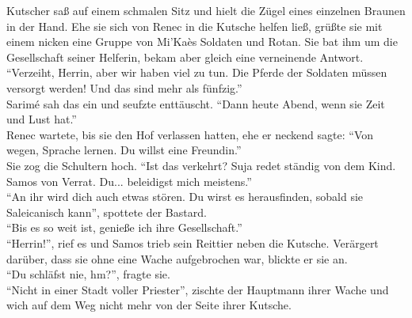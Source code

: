 Kutscher saß auf einem schmalen Sitz und hielt die Zügel eines einzelnen Braunen in der Hand. Ehe 
sie sich von Renec in die Kutsche helfen ließ, grüßte sie mit einem nicken eine Gruppe von Mi'Kaès 
Soldaten und Rotan. Sie bat ihm um die Gesellschaft seiner Helferin, bekam aber gleich eine 
verneinende Antwort. ``Verzeiht, Herrin, aber wir haben viel zu tun. Die Pferde der Soldaten müssen 
versorgt werden! Und das sind mehr als fünfzig.''\\
Sarimé sah das ein und seufzte enttäuscht. ``Dann heute Abend, wenn sie Zeit und Lust hat.''\\
Renec wartete, bis sie den Hof verlassen hatten, ehe er neckend sagte: ``Von wegen, Sprache lernen. 
Du willst eine Freundin.''\\
Sie zog die Schultern hoch. ``Ist das verkehrt? Suja redet ständig von dem Kind. Samos von Verrat. 
Du... beleidigst mich meistens.''\\
``An ihr wird dich auch etwas stören. Du wirst es herausfinden, sobald sie Saleicanisch kann'', 
spottete der Bastard.\\
``Bis es so weit ist, genieße ich ihre Gesellschaft.''\\
``Herrin!'', rief es und Samos trieb sein Reittier neben die Kutsche. Verärgert darüber, dass sie 
ohne eine Wache aufgebrochen war, blickte er sie an.\\
``Du schläfst nie, hm?'', fragte sie.\\
``Nicht in einer Stadt voller Priester'', zischte der Hauptmann ihrer Wache und wich auf dem Weg 
nicht mehr von der Seite ihrer Kutsche.\\

